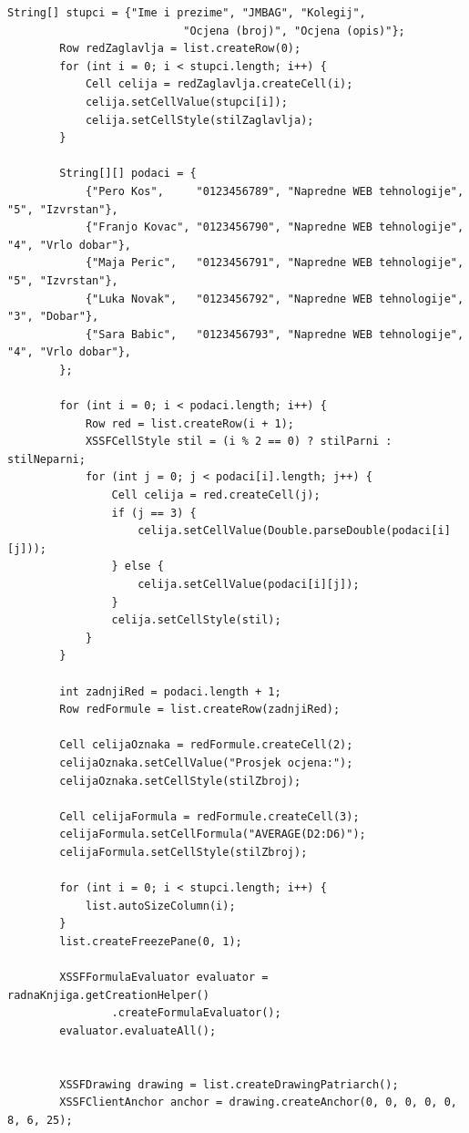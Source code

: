 \documentclass[]{foi}
\begin{document}
\begin{lstlisting}[style=Java, caption=Excel izvještaj]
        String[] stupci = {"Ime i prezime", "JMBAG", "Kolegij",
                           "Ocjena (broj)", "Ocjena (opis)"};
        Row redZaglavlja = list.createRow(0);
        for (int i = 0; i < stupci.length; i++) {
            Cell celija = redZaglavlja.createCell(i);
            celija.setCellValue(stupci[i]);
            celija.setCellStyle(stilZaglavlja);
        }

        String[][] podaci = {
            {"Pero Kos",     "0123456789", "Napredne WEB tehnologije", "5", "Izvrstan"},
            {"Franjo Kovac", "0123456790", "Napredne WEB tehnologije", "4", "Vrlo dobar"},
            {"Maja Peric",   "0123456791", "Napredne WEB tehnologije", "5", "Izvrstan"},
            {"Luka Novak",   "0123456792", "Napredne WEB tehnologije", "3", "Dobar"},
            {"Sara Babic",   "0123456793", "Napredne WEB tehnologije", "4", "Vrlo dobar"},
        };

        for (int i = 0; i < podaci.length; i++) {
            Row red = list.createRow(i + 1);
            XSSFCellStyle stil = (i % 2 == 0) ? stilParni : stilNeparni;
            for (int j = 0; j < podaci[i].length; j++) {
                Cell celija = red.createCell(j);
                if (j == 3) {
                    celija.setCellValue(Double.parseDouble(podaci[i][j]));
                } else {
                    celija.setCellValue(podaci[i][j]);
                }
                celija.setCellStyle(stil);
            }
        }

        int zadnjiRed = podaci.length + 1;
        Row redFormule = list.createRow(zadnjiRed);

        Cell celijaOznaka = redFormule.createCell(2);
        celijaOznaka.setCellValue("Prosjek ocjena:");
        celijaOznaka.setCellStyle(stilZbroj);

        Cell celijaFormula = redFormule.createCell(3);
        celijaFormula.setCellFormula("AVERAGE(D2:D6)");
        celijaFormula.setCellStyle(stilZbroj);

        for (int i = 0; i < stupci.length; i++) {
            list.autoSizeColumn(i);
        }
        list.createFreezePane(0, 1);

        XSSFFormulaEvaluator evaluator = radnaKnjiga.getCreationHelper()
                .createFormulaEvaluator();
        evaluator.evaluateAll();


        XSSFDrawing drawing = list.createDrawingPatriarch();
        XSSFClientAnchor anchor = drawing.createAnchor(0, 0, 0, 0, 0, 8, 6, 25);


\end{lstlisting}
\end{document}
